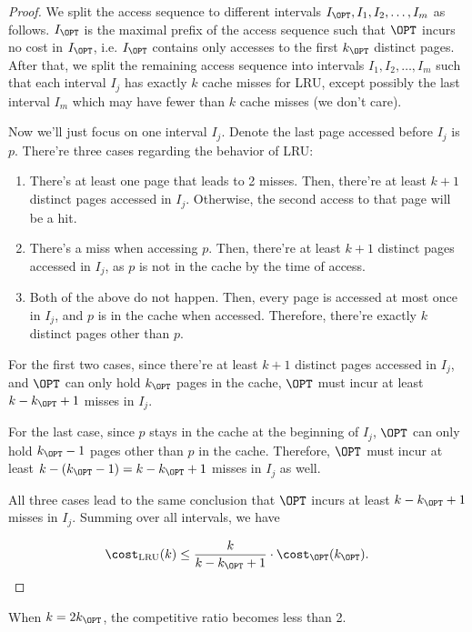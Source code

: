 \begin{proof}
We split the access sequence to different intervals $I_\OPT, I_1, I_2, \ldots, I_m$ as follows. $I_\OPT$ is the maximal prefix of the access sequence such that $\OPT$ incurs no cost in $I_\OPT$, i.e. $I_\OPT$ contains only accesses to the first $k_{\OPT}$ distinct pages. After that, we split the remaining access sequence into intervals $I_1, I_2, \ldots, I_m$ such that each interval $I_j$ has exactly $k$ cache misses for LRU, except possibly the last interval $I_m$ which may have fewer than $k$ cache misses (we don't care).

Now we'll just focus on one interval $I_j$. Denote the last page accessed before $I_j$ is $p$.
There're three cases regarding the behavior of LRU:
\begin{enumerate}
  \item There's at least one page that leads to 2 misses. Then, there're at least $k+1$ distinct pages accessed in $I_j$. Otherwise, the second access to that page will be a hit.
  \item There's a miss when accessing $p$. Then, there're at least $k+1$ distinct pages accessed in $I_j$, as $p$ is not in the cache by the time of access.
  \item Both of the above do not happen. Then, every page is accessed at most once in $I_j$, and $p$ is in the cache when accessed. Therefore, there're exactly $k$ distinct pages other than $p$.
\end{enumerate}

For the first two cases, since there're at least $k+1$ distinct pages accessed in $I_j$, and $\OPT$ can only hold $k_{\OPT}$ pages in the cache, $\OPT$ must incur at least $k - k_{\OPT} + 1$ misses in $I_j$.

For the last case, since $p$ stays in the cache at the beginning of $I_j$, $\OPT$ can only hold $k_{\OPT} - 1$ pages other than $p$ in the cache. Therefore, $\OPT$ must incur at least $k - (k_{\OPT} - 1) = k - k_{\OPT} + 1$ misses in $I_j$ as well.

All three cases lead to the same conclusion that $\OPT$ incurs at least $k - k_{\OPT} + 1$ misses in $I_j$. Summing over all intervals, we have

\[ \cost_{\text{LRU}}(k) \leq \frac{k}{k - k_{\OPT} + 1} \cdot \cost_{\OPT}(k_{\OPT}). \]
\end{proof}  

\begin{corollary}
  When $k = 2k_\OPT$, the competitive ratio becomes less than 2.
\end{corollary}   
